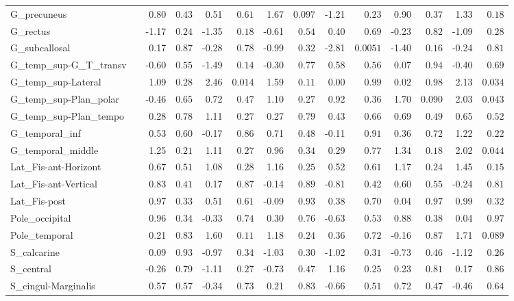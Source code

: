 {\begin{longtable}{llrrrrrrrrrrrr}
G\_precuneus &  & 0.80 & $0.43$ & 0.51 & $0.61$ & 1.67 & $0.097$ & -1.21 & $0.23$ & 0.90 & $0.37$ & 1.33 & $0.18$ \\
G\_rectus &  & -1.17 & $0.24$ & -1.35 & $0.18$ & -0.61 & $0.54$ & 0.40 & $0.69$ & -0.23 & $0.82$ & -1.09 & $0.28$ \\
G\_subcallosal &  & 0.17 & $0.87$ & -0.28 & $0.78$ & -0.99 & $0.32$ & -2.81 & $0.0051$ & -1.40 & $0.16$ & -0.24 & $0.81$ \\
G\_temp\_sup-G\_T\_transv &  & -0.60 & $0.55$ & -1.49 & $0.14$ & -0.30 & $0.77$ & 0.58 & $0.56$ & 0.07 & $0.94$ & -0.40 & $0.69$ \\
G\_temp\_sup-Lateral &  & 1.09 & $0.28$ & 2.46 & $0.014$ & 1.59 & $0.11$ & 0.00 & $0.99$ & 0.02 & $0.98$ & 2.13 & $0.034$ \\
G\_temp\_sup-Plan\_polar &  & -0.46 & $0.65$ & 0.72 & $0.47$ & 1.10 & $0.27$ & 0.92 & $0.36$ & 1.70 & $0.090$ & 2.03 & $0.043$ \\
G\_temp\_sup-Plan\_tempo &  & 0.28 & $0.78$ & 1.11 & $0.27$ & 0.27 & $0.79$ & 0.43 & $0.66$ & 0.69 & $0.49$ & 0.65 & $0.52$ \\
G\_temporal\_inf &  & 0.53 & $0.60$ & -0.17 & $0.86$ & 0.71 & $0.48$ & -0.11 & $0.91$ & 0.36 & $0.72$ & 1.22 & $0.22$ \\
G\_temporal\_middle &  & 1.25 & $0.21$ & 1.11 & $0.27$ & 0.96 & $0.34$ & 0.29 & $0.77$ & 1.34 & $0.18$ & 2.02 & $0.044$ \\
Lat\_Fis-ant-Horizont &  & 0.67 & $0.51$ & 1.08 & $0.28$ & 1.16 & $0.25$ & 0.52 & $0.61$ & 1.17 & $0.24$ & 1.45 & $0.15$ \\
Lat\_Fis-ant-Vertical &  & 0.83 & $0.41$ & 0.17 & $0.87$ & -0.14 & $0.89$ & -0.81 & $0.42$ & 0.60 & $0.55$ & -0.24 & $0.81$ \\
Lat\_Fis-post &  & 0.97 & $0.33$ & 0.51 & $0.61$ & -0.09 & $0.93$ & 0.38 & $0.70$ & 0.04 & $0.97$ & 0.99 & $0.32$ \\
Pole\_occipital &  & 0.96 & $0.34$ & -0.33 & $0.74$ & 0.30 & $0.76$ & -0.63 & $0.53$ & 0.88 & $0.38$ & 0.04 & $0.97$ \\
Pole\_temporal &  & 0.21 & $0.83$ & 1.60 & $0.11$ & 1.18 & $0.24$ & 0.36 & $0.72$ & -0.16 & $0.87$ & 1.71 & $0.089$ \\
S\_calcarine &  & 0.09 & $0.93$ & -0.97 & $0.34$ & -1.03 & $0.30$ & -1.02 & $0.31$ & -0.73 & $0.46$ & -1.12 & $0.26$ \\
S\_central &  & -0.26 & $0.79$ & -1.11 & $0.27$ & -0.73 & $0.47$ & 1.16 & $0.25$ & 0.23 & $0.81$ & 0.17 & $0.86$ \\
S\_cingul-Marginalis &  & 0.57 & $0.57$ & -0.34 & $0.73$ & 0.21 & $0.83$ & -0.66 & $0.51$ & 0.72 & $0.47$ & -0.46 & $0.64$ \\

\end{longtable}}
